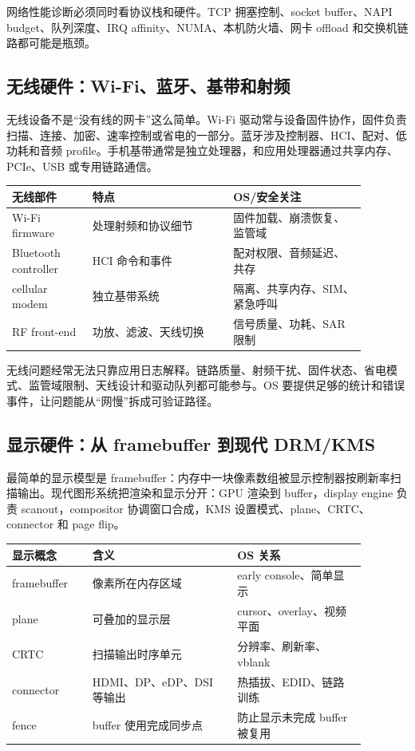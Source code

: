 网络性能诊断必须同时看协议栈和硬件。TCP 拥塞控制、socket buffer、NAPI budget、队列深度、IRQ affinity、NUMA、本机防火墙、网卡 offload 和交换机链路都可能是瓶颈。

\subsection{无线硬件：Wi-Fi、蓝牙、基带和射频}

无线设备不是“没有线的网卡”这么简单。Wi-Fi 驱动常与设备固件协作，固件负责扫描、连接、加密、速率控制或省电的一部分。蓝牙涉及控制器、HCI、配对、低功耗和音频 profile。手机基带通常是独立处理器，和应用处理器通过共享内存、PCIe、USB 或专用链路通信。

\begin{longtable}{p{0.2\linewidth}p{0.35\linewidth}p{0.33\linewidth}}
\toprule
无线部件 & 特点 & OS/安全关注 \\
\midrule
Wi-Fi firmware & 处理射频和协议细节 & 固件加载、崩溃恢复、监管域 \\
Bluetooth controller & HCI 命令和事件 & 配对权限、音频延迟、共存 \\
cellular modem & 独立基带系统 & 隔离、共享内存、SIM、紧急呼叫 \\
RF front-end & 功放、滤波、天线切换 & 信号质量、功耗、SAR 限制 \\
\bottomrule
\end{longtable}

无线问题经常无法只靠应用日志解释。链路质量、射频干扰、固件状态、省电模式、监管域限制、天线设计和驱动队列都可能参与。OS 要提供足够的统计和错误事件，让问题能从“网慢”拆成可验证路径。

\subsection{显示硬件：从 framebuffer 到现代 DRM/KMS}

最简单的显示模型是 framebuffer：内存中一块像素数组被显示控制器按刷新率扫描输出。现代图形系统把渲染和显示分开：GPU 渲染到 buffer，display engine 负责 scanout，compositor 协调窗口合成，KMS 设置模式、plane、CRTC、connector 和 page flip。

\begin{longtable}{p{0.2\linewidth}p{0.36\linewidth}p{0.32\linewidth}}
\toprule
显示概念 & 含义 & OS 关系 \\
\midrule
framebuffer & 像素所在内存区域 & early console、简单显示 \\
plane & 可叠加的显示层 & cursor、overlay、视频平面 \\
CRTC & 扫描输出时序单元 & 分辨率、刷新率、vblank \\
connector & HDMI、DP、eDP、DSI 等输出 & 热插拔、EDID、链路训练 \\
fence & buffer 使用完成同步点 & 防止显示未完成 buffer 被复用 \\
\bottomrule
\end{longtable}

